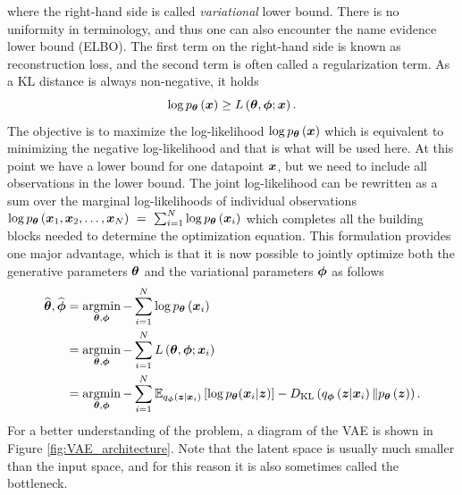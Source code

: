 where the right-hand side is called \emph{variational} lower bound. There is no uniformity in terminology, and thus one can also encounter the name evidence lower bound (ELBO). The first term on the right-hand side is known as reconstruction loss, and the second term is often called a regularization term. As a KL distance is always non-negative, it holds
\begin{equation}
    \log p_{\boldsymbol{\theta}}\left(\boldsymbol{x}\right) \geq L\left(\boldsymbol{\theta},\boldsymbol{\phi}; \boldsymbol{x}\right).
\end{equation}
The objective is to maximize the log-likelihood $\log p_{\boldsymbol{\theta}}\left(\boldsymbol{x}\right)$ which is equivalent to minimizing the negative log-likelihood and that is what will be used here. At this point we have a lower bound for one datapoint $\boldsymbol{x}$, but we need to include all observations in the lower bound. The joint log-likelihood can be rewritten as a sum over the marginal log-likelihoods of individual observations $\log p_{\boldsymbol{\theta}}\left(\boldsymbol{x}_1,\boldsymbol{x}_2,\dots,\boldsymbol{x}_N\right)~=~\sum_{i=1}^N\log p_{\boldsymbol{\theta}}\left(\boldsymbol{x}_i\right)$ which completes all the building blocks needed to determine the optimization equation. This formulation provides one major advantage, which is that it is now possible to jointly optimize both the generative parameters $\boldsymbol{\theta}$ and the variational parameters $\boldsymbol{\phi}$ as follows 
\begin{align}
   \widehat{\boldsymbol{\theta}}, \widehat{\boldsymbol{\phi}} &= \mathop{\mathrm{argmin}}_{\boldsymbol{\theta},\boldsymbol{\phi}}-\sum_{i=1}^N\log p_{\boldsymbol{\theta}}\left(\boldsymbol{x}_i\right)\\
   &=\mathop{\mathrm{argmin}}_{\boldsymbol{\theta},\boldsymbol{\phi}}-\sum_{i=1}^N L\left(\boldsymbol{\theta},\boldsymbol{\phi}; \boldsymbol{x}_i\right)\\
  &= \mathop{\mathrm{argmin}}_{\boldsymbol{\theta},\boldsymbol{\phi}}-\sum_{i=1}^N\mathbb{E}_{q_{\boldsymbol{\phi}}\left(\boldsymbol{z}\vert \boldsymbol{x}_i \right)}\left[\log p_{\boldsymbol{\theta}}(\boldsymbol{x}_i\vert \boldsymbol{z}) \right] - D_{\mathrm{KL}}\left(q_{\boldsymbol{\phi}}\left(\boldsymbol{z}\vert\boldsymbol{x}_i \right) \Vert p_{\boldsymbol{\theta}}\left(\boldsymbol{z}\right)\right).\label{eq:VAEloss}
\end{align}
For a better understanding of the problem, a diagram of the VAE is shown in Figure \ref{fig:VAE_architecture}. Note that the latent space is usually much smaller than the input space, and for this reason it is also sometimes called the bottleneck. 


